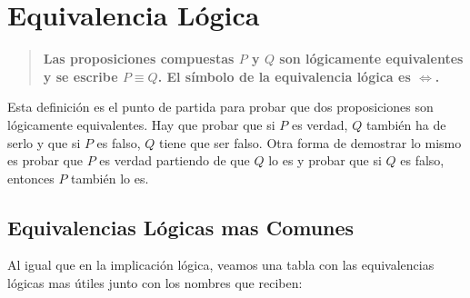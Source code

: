\documentclass[a4paper,11pt,oneside,titlepage,final]{scrartc}
\begin{document}
\newpage

\section{Equivalencia Lógica}

\begin{quote}
\textbf{Las proposiciones compuestas $P$ y $Q$ son lógicamente equivalentes y se escribe $P \equiv Q$. El símbolo de la equivalencia lógica es $\Longleftrightarrow$.}
\end{quote}

Esta definición es el punto de partida para probar que dos proposiciones son lógicamente equivalentes. Hay que probar que si $P$ es verdad, $Q$ también ha de serlo y que si $P$ es falso, $Q$ tiene que ser falso. Otra forma de demostrar lo mismo es probar que $P$ es verdad partiendo de que $Q$ lo es y probar que si $Q$ es falso, entonces $P$ también lo es.\\


\subsection{Equivalencias Lógicas mas Comunes}

Al igual que en la implicación lógica, veamos una tabla con las equivalencias lógicas mas útiles junto con los nombres que reciben:
\end{document}

